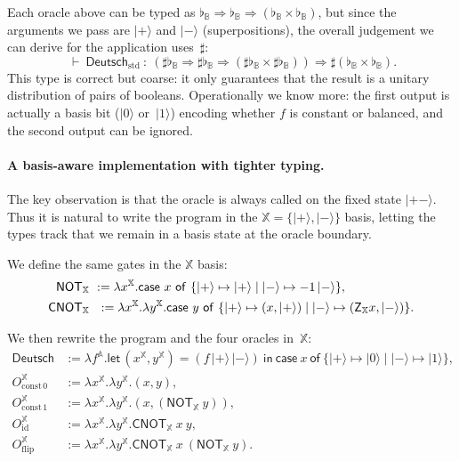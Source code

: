 \documentclass[runningheads,orivec,envcountsame,envcountsect]{llncs}
\newcommand\ket[1]{\ensuremath{|#1\rangle}}
\newcommand\AbsBasis{\ensuremath{\mathbb{A}}}
\def\Pair#1#2{(#1,#2)} %
\def\Lam#1#2#3{\lambda#1^{#2}{.}#3} %
\def\letkeyword{\mathsf{let}}
\def\inkeyword{\mathsf{in}}
\def\LetP#1#2#3#4#5#6{\letkeyword\,\Pair{#1^{#2}}{#3^{#4}}=#5~\inkeyword~#6}
\def\case#1#2#3#4#5{\ensuremath{\mathsf{case}~#1~\mathsf{of}~\{#2\mapsto #4 \mid #3\mapsto #5\}}}
\def\Arr{\Rightarrow}
\def\TYP#1#2#3{#1~{\vdash}~#2~{:}~#3}
\newcommand\B{\mathbb B}
\newcommand\XB{\mathbb X}
\newcommand{\pauliZXB}{\mathsf{Z}_{\XB}}
\newcommand{\cnotXB}[2]{\mathsf{CNOT}_{\XB}\ #1\ #2}
\newcommand{\pauliXXB}[1]{\mathsf{NOT}_{\XB}\ #1}
\newcommand\basis[1]{\ensuremath{\flat_{#1}}}
\begin{document}
Each oracle above can be typed as
\(
  \basis{\B}\Arr\basis{\B}\Arr(\basis{\B}\times\basis{\B})
\),
but since the arguments we pass are $\ket{+}$ and $\ket{-}$ (superpositions),
the overall judgement we can derive for the application uses~$\sharp$:
\[
  \TYP{}{\mathsf{Deutsch}_{\mathrm{std}}}
  {(\sharp\basis{\B}\Arr\sharp\basis{\B}\Arr(\sharp\basis{\B}\times\sharp\basis{\B}))
   \Arr \sharp(\basis{\B}\times\basis{\B})}.
\]
This type is correct but coarse: it only guarantees that the result is a
unitary distribution of pairs of booleans.  Operationally we know more: the
first output is actually a basis bit ($\ket{0}$ or~$\ket{1}$) encoding whether
$f$ is constant or balanced, and the second output can be ignored.

\paragraph{A basis-aware implementation with tighter typing.}
The key observation is that the oracle is always called on the fixed state
$\ket{+-}$.  
Thus it is natural to write the program in the
$\XB=\{\ket{+},\ket{-}\}$ basis, letting the types track that we remain in a
basis state at the oracle boundary.

We define the same gates in the $\XB$ basis:
\begin{align*}
  \pauliXXB &:= \Lam{x}{\XB}{\case{x}{\ket{+}}{\ket{-}}{\ket{+}}{-1\,\ket{-}}},\\
  \cnotXB &:= \Lam{x}{\XB}{\Lam{y}{\XB}{
    \case{y}{\ket{+}}{\ket{-}}
      {\Pair{x}{\ket{+}}}
      {\Pair{\pauliZXB{x}}{\ket{-}}}
  }}.
\end{align*}

We then rewrite the program and the four oracles in~$\XB$:
\begin{align*}
  \mathsf{Deutsch} &:= \Lam{f}{\AbsBasis}{
    \LetP{x}{\XB}{y}{\XB}{(f\,\ket{+}\,\ket{-})}
      {\case{x}{\ket{+}}{\ket{-}}{\ket{0}}{\ket{1}}}},\\
  O_{\mathrm{const}\,0}^{\XB} &:= \Lam{x}{\XB}{\Lam{y}{\XB}{\Pair{x}{y}}},\\
  O_{\mathrm{const}\,1}^{\XB} &:= \Lam{x}{\XB}{\Lam{y}{\XB}{\Pair{x}{(\pauliXXB{y})}}},\\
  O_{\mathrm{id}}^{\XB}\ \ &:= \Lam{x}{\XB}{\Lam{y}{\XB}{\cnotXB{x}{y}}},\\
  O_{\mathrm{flip}}^{\XB} &:= \Lam{x}{\XB}{\Lam{y}{\XB}{\cnotXB{x}{(\pauliXXB{y})}}}.
\end{align*}
\end{document}
